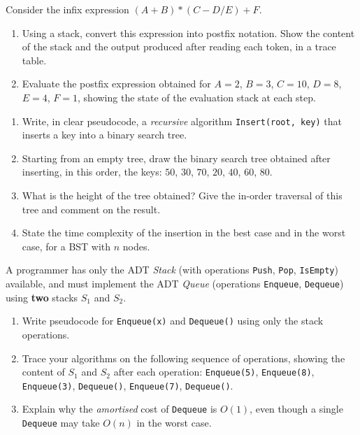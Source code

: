 \documentclass[11pt]{article}
\begin{document}
\begin{exercice}
Consider the infix expression $(A + B) * (C - D / E) + F$.
\begin{enumerate}
\item Using a stack, convert this expression into postfix notation. Show the content of the stack and the output produced after reading each token, in a trace table.
\item Evaluate the postfix expression obtained for $A = 2$, $B = 3$, $C = 10$, $D = 8$, $E = 4$, $F = 1$, showing the state of the evaluation stack at each step.
\end{enumerate}
\end{exercice}

\begin{exercice}
\begin{enumerate}
\item Write, in clear pseudocode, a \emph{recursive} algorithm \texttt{Insert(root, key)} that inserts a key into a binary search tree.
\item Starting from an empty tree, draw the binary search tree obtained after inserting, in this order, the keys: $50$, $30$, $70$, $20$, $40$, $60$, $80$.
\item What is the height of the tree obtained? Give the in-order traversal of this tree and comment on the result.
\item State the time complexity of the insertion in the best case and in the worst case, for a BST with $n$ nodes.
\end{enumerate}
\end{exercice}

\begin{exercice}
A programmer has only the ADT \emph{Stack} (with operations \texttt{Push}, \texttt{Pop}, \texttt{IsEmpty}) available, and must implement the ADT \emph{Queue} (operations \texttt{Enqueue}, \texttt{Dequeue}) using \textbf{two} stacks $S_1$ and $S_2$.
\begin{enumerate}
\item Write pseudocode for \texttt{Enqueue(x)} and \texttt{Dequeue()} using only the stack operations.
\item Trace your algorithms on the following sequence of operations, showing the content of $S_1$ and $S_2$ after each operation: \texttt{Enqueue(5)}, \texttt{Enqueue(8)}, \texttt{Enqueue(3)}, \texttt{Dequeue()}, \texttt{Enqueue(7)}, \texttt{Dequeue()}.
\item Explain why the \emph{amortised} cost of \texttt{Dequeue} is $O(1)$, even though a single \texttt{Dequeue} may take $O(n)$ in the worst case.
\end{enumerate}
\end{exercice}
\end{document}
